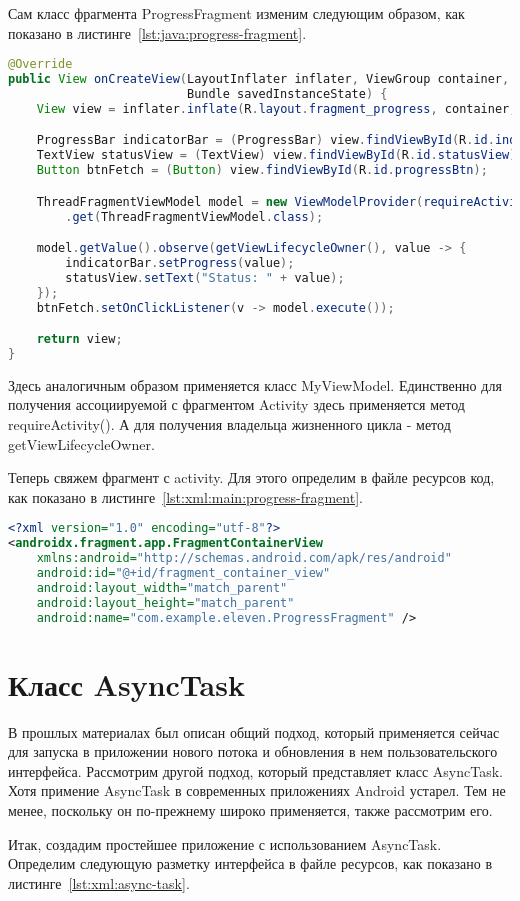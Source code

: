 Сам класс фрагмента ProgressFragment изменим следующим образом,
как показано в листинге~\ref{lst:java:progress-fragment}.

\begin{lstlisting}[language=Java
	, label=lst:java:progress-fragment
	]
@Override
public View onCreateView(LayoutInflater inflater, ViewGroup container,
						 Bundle savedInstanceState) {
	View view = inflater.inflate(R.layout.fragment_progress, container, false);

	ProgressBar indicatorBar = (ProgressBar) view.findViewById(R.id.indicator);
	TextView statusView = (TextView) view.findViewById(R.id.statusView);
	Button btnFetch = (Button) view.findViewById(R.id.progressBtn);

	ThreadFragmentViewModel model = new ViewModelProvider(requireActivity())
		.get(ThreadFragmentViewModel.class);

	model.getValue().observe(getViewLifecycleOwner(), value -> {
		indicatorBar.setProgress(value);
		statusView.setText("Status: " + value);
	});
	btnFetch.setOnClickListener(v -> model.execute());

	return view;
}
\end{lstlisting}

Здесь аналогичным образом применяется класс MyViewModel. Единственно
для получения ассоциируемой с фрагментом Activity здесь применяется
метод requireActivity(). А для получения владельца жизненного цикла -
метод getViewLifecycleOwner.\par
Теперь свяжем фрагмент с activity. Для этого определим в файле
ресурсов код, как показано в листинге~\ref{lst:xml:main:progress-fragment}.

\begin{lstlisting}[language=XML
	, label=lst:xml:main:progress-fragment
	]
<?xml version="1.0" encoding="utf-8"?>
<androidx.fragment.app.FragmentContainerView
    xmlns:android="http://schemas.android.com/apk/res/android"
    android:id="@+id/fragment_container_view"
    android:layout_width="match_parent"
    android:layout_height="match_parent"
    android:name="com.example.eleven.ProgressFragment" />
\end{lstlisting}

\section{Класс AsyncTask}
В прошлых материалах был описан общий подход, который применяется
сейчас для запуска в приложении нового потока и обновления в нем
пользовательского интерфейса. Рассмотрим другой подход, который
представляет класс AsyncTask. Хотя примение AsyncTask в современных
приложениях Android устарел. Тем не менее, поскольку он по-прежнему
широко применяется, также рассмотрим его.\par
Итак, создадим простейшее приложение с использованием AsyncTask.
Определим следующую разметку интерфейса в файле ресурсов,
как показано в листинге~\ref{lst:xml:async-task}.

